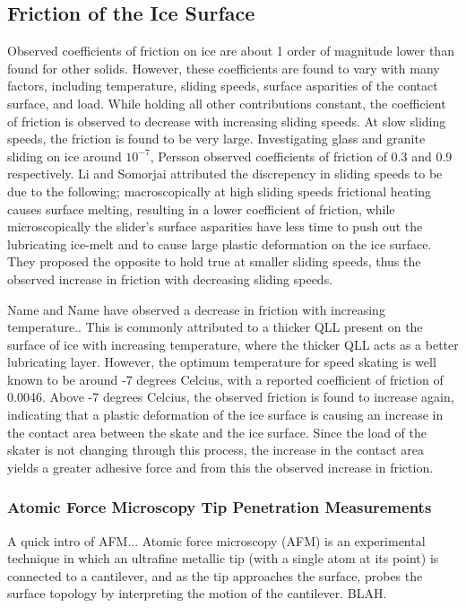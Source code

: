 \subsection{Friction of the Ice Surface}
Observed coefficients of friction on ice are about 1 order of
magnitude lower than found for other solids. However, these
coefficients are found to vary with many factors, including
temperature, sliding speeds, surface asparities of the contact
surface, and load.\cite{Evans1976,Kietzig2002,Persson2001,Persson2015} While
holding all other contributions constant, the coefficient of friction
is observed to decrease with increasing sliding speeds. At slow
sliding speeds, the friction is found to be very large. Investigating
glass and granite sliding on ice around $10^{-7}$, Persson observed
coefficients of friction of 0.3 and 0.9 respectively.\cite{Persson2000} Li and
Somorjai attributed the discrepency in sliding speeds to be due to the
following; macroscopically at high sliding speeds frictional heating
causes surface melting, resulting in a lower coefficient of friction,
while microscopically the slider's surface asparities have less time
to push out the lubricating ice-melt and to cause large plastic
deformation on the ice surface.\cite{Li2007} They proposed the
opposite to hold true at smaller sliding speeds, thus the observed
increase in friction with decreasing sliding speeds.

Name and Name have observed a decrease in friction with increasing
temperature.\cite{Evans1976,Colbeck1997}. This is commonly attributed to a
thicker QLL present on the surface of ice with increasing temperature,
where the thicker QLL acts as a better lubricating layer. However, the
optimum temperature for speed skating is well known to be around -7
degrees Celcius, with a reported coefficient of friction of
0.0046.\cite{Dekoning1992} Above -7 degrees Celcius, the observed
friction is found to increase again, indicating that a plastic
deformation of the ice surface is causing an increase in the contact
area between the skate and the ice surface.\cite{Barnes1966,Barnes1971}
Since the load of the skater is not changing through this process, the
increase in the contact area yields a greater adhesive force and from
this the observed increase in friction.

\subsubsection{Atomic Force Microscopy Tip Penetration Measurements}
A quick intro of AFM...  Atomic force microscopy (AFM) is an
experimental technique in which an ultrafine metallic tip (with a
single atom at its point) is connected to a cantilever, and as the tip
approaches the surface, probes the surface topology by interpreting
the motion of the cantilever. BLAH. 

